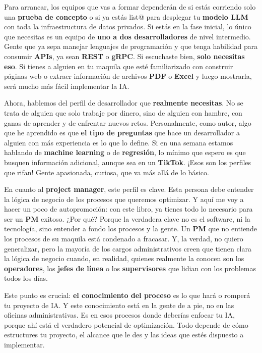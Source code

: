 \documentclass[
  10pt,
  letterpaper,
]{book}
\begin{document}
Para arrancar, los equipos que vas a formar dependerán de si estás
corriendo solo una \textbf{prueba de concepto} o si ya estás list@ para
desplegar tu \textbf{modelo LLM} con toda la infraestructura de datos
privados. Si estás en la fase inicial, lo único que necesitas es un
equipo de \textbf{uno a dos desarrolladores} de nivel intermedio. Gente
que ya sepa manejar lenguajes de programación y que tenga habilidad para
consumir \textbf{APIs}, ya sean \textbf{REST} o \textbf{gRPC}. Si
escuchaste bien, \textbf{solo necesitas eso}. Si tienes a alguien en tu
maquila que esté familiarizado con construir páginas web o extraer
información de archivos \textbf{PDF} o \textbf{Excel} y luego mostrarla,
será mucho más fácil implementar la IA.

Ahora, hablemos del perfil de desarrollador que \textbf{realmente
necesitas}. No se trata de alguien que solo trabaje por dinero, sino de
alguien con hambre, con ganas de aprender y de enfrentar nuevos retos.
Personalmente, como autor, algo que he aprendido es que \textbf{el tipo
de preguntas} que hace un desarrollador a alguien con más experiencia es
lo que lo define. Si en una semana estamos hablando de \textbf{machine
learning} o de \textbf{regresión}, lo mínimo que espero es que busquen
información adicional, aunque sea en un \textbf{TikTok}. ¡Esos son los
perfiles que rifan! Gente apasionada, curiosa, que va más allá de lo
básico.

En cuanto al \textbf{project manager}, este perfil es clave. Esta
persona debe entender la lógica de negocio de los procesos que queremos
optimizar. Y aquí me voy a hacer un poco de autopromoción: con este
libro, ya tienes todo lo necesario para ser un \textbf{PM} exitoso. ¿Por
qué? Porque la verdadera clave no es el software, ni la tecnología, sino
entender a fondo los procesos y la gente. Un \textbf{PM} que no entiende
los procesos de su maquila está condenado a fracasar. Y, la verdad, no
quiero generalizar, pero la mayoría de los cargos administrativos creen
que tienen clara la lógica de negocio cuando, en realidad, quienes
realmente la conocen son los \textbf{operadores}, los \textbf{jefes de
línea} o los \textbf{supervisores} que lidian con los problemas todos
los días.

Este punto es crucial: \textbf{el conocimiento del proceso} es lo que
hará o romperá tu proyecto de IA. Y este conocimiento está en la gente
de a pie, no en las oficinas administrativas. Es en esos procesos donde
deberías enfocar tu IA, porque ahí está el verdadero potencial de
optimización. Todo depende de cómo estructures tu proyecto, el alcance
que le des y las ideas que estés dispuesto a implementar.
\end{document}
